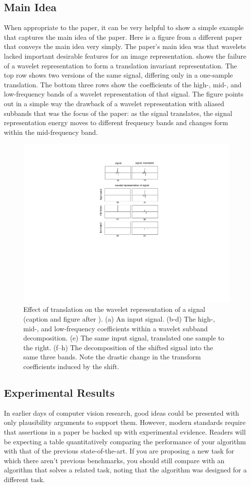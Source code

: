 \subsection{Main Idea}
When appropriate to the paper, it can be very helpful to show a simple example that captures the main idea of the paper.  Here is a figure from a different paper \cite{Simoncelli92} that conveys the main idea very simply.  The paper's main idea was that wavelets lacked important desirable features for an image representation.  \Fig{\ref{fig:wavelet}} shows the failure of a wavelet representation to form a  translation invariant representation.  The top row shows two versions of the same signal, differing only in a one-sample translation.  The bottom three rows show the coefficients of the high-, mid-, and low-frequency bands of a wavelet representation of that signal.  The figure points out in a simple way the drawback of a wavelet representation with aliased subbands that was the focus of the paper:  as the signal translates, the signal representation energy moves to different frequency bands and changes form within the mid-frequency band.


\begin{figure}
\centerline{
\includegraphics[width=0.65\linewidth]{figures/papers/wavelet2.pdf}}
\caption{Effect of translation on the wavelet representation of a signal  (caption and figure after \cite{Simoncelli92}).  (a) An input signal.  (b-d) The high-, mid-, and low-frequency coefficients within a wavelet subband decomposition.  (e) The same input signal, translated one sample to the right.  (f–h) The decomposition of the shifted signal into the same three bands.  Note the drastic change in the transform coefficients induced by the shift.}
\label{fig:wavelet}
\end{figure}


\subsection{Experimental Results}
In earlier days of computer vision research, good ideas could be presented with only plausibility arguments to support them.  However, 
modern standards require that assertions in a paper be backed up with experimental evidence.  Readers will be expecting a table quantitatively comparing the performance of your algorithm with that of the previous state-of-the-art.  If you are proposing a new task for which there aren't previous benchmarks, you should still compare with an algorithm that solves a related task, noting that the algorithm was designed for a different task.  

